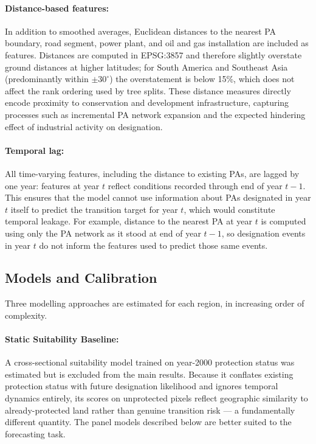 \documentclass[12pt]{article}
\theoremstyle{break}
\begin{document}
\paragraph{Distance-based features:}
In addition to smoothed averages, Euclidean distances to the nearest PA boundary,
road segment, power plant, and oil and gas installation are included as features.
Distances are computed in EPSG:3857 and therefore slightly overstate ground distances
at higher latitudes; for South America and Southeast Asia (predominantly within
$\pm 30^\circ$) the overstatement is below 15\%, which does not affect the rank
ordering used by tree splits.
These distance measures directly encode proximity to conservation and development
infrastructure, capturing processes such as incremental PA network expansion and
the expected hindering effect of industrial activity on designation.

\paragraph{Temporal lag:}
All time-varying features, including the distance to existing PAs, are lagged by
one year: features at year $t$ reflect conditions recorded through end of year $t-1$.
This ensures that the model cannot use information about PAs designated in year $t$
itself to predict the transition target for year $t$, which would constitute temporal
leakage. For example, distance to the nearest PA at year $t$ is computed using only
the PA network as it stood at end of year $t-1$, so designation events in year $t$ do
not inform the features used to predict those same events.

\subsection{Models and Calibration}
\label{sec:models}

Three modelling approaches are estimated for each region, in increasing order of
complexity.

\paragraph{Static Suitability Baseline:}
A cross-sectional suitability model trained on year-2000 protection status was
estimated but is excluded from the main results. Because it conflates existing
protection status with future designation likelihood and ignores temporal dynamics
entirely, its scores on unprotected pixels reflect geographic similarity to
already-protected land rather than genuine transition risk --- a fundamentally
different quantity. The panel models described below are better suited to the
forecasting task.
\end{document}
